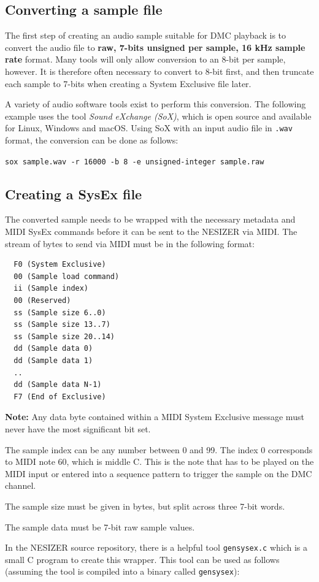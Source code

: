 \documentclass[a4paper, 12p]{extarticle}
\begin{document}
\subsection{Converting a sample file}
The first step of creating an audio sample suitable for DMC playback is to convert the audio file to \textbf{raw, 7-bits unsigned per sample, 16 kHz sample rate} format. Many tools will only allow conversion to an 8-bit per sample, however. It is therefore often necessary to convert to 8-bit first, and then truncate each sample to 7-bits when creating a System Exclusive file later.

A variety of audio software tools exist to perform this conversion. The following example uses the tool \emph{Sound eXchange (SoX)}, which is open source and available for Linux, Windows and macOS. Using SoX with an input audio file in \verb+.wav+ format, the conversion can be done as follows:

\verb+sox sample.wav -r 16000 -b 8 -e unsigned-integer sample.raw+

\subsection{Creating a SysEx file}
The converted sample needs to be wrapped with the necessary metadata and MIDI SysEx commands before it can be sent to the NESIZER via MIDI. The stream of bytes to send via MIDI must be in the following format:

\begin{verbatim}
  F0 (System Exclusive)
  00 (Sample load command)
  ii (Sample index)
  00 (Reserved)
  ss (Sample size 6..0)
  ss (Sample size 13..7)
  ss (Sample size 20..14)
  dd (Sample data 0)
  dd (Sample data 1)
  ..
  dd (Sample data N-1)
  F7 (End of Exclusive)
\end{verbatim}

\textbf{Note:} Any data byte contained within a MIDI System Exclusive message must never have the most significant bit set.

The sample index can be any number between 0 and 99. The index 0 corresponds to MIDI note 60, which is middle C. This is the note that has to be played on the MIDI input or entered into a sequence pattern to trigger the sample on the DMC channel.

The sample size must be given in bytes, but split across three 7-bit words.

The sample data must be 7-bit raw sample values.

In the NESIZER source repository, there is a helpful tool \verb+gensysex.c+ which is a small C program to create this wrapper. This tool can be used as follows (assuming the tool is compiled into a binary called \verb+gensysex+):
\end{document}
